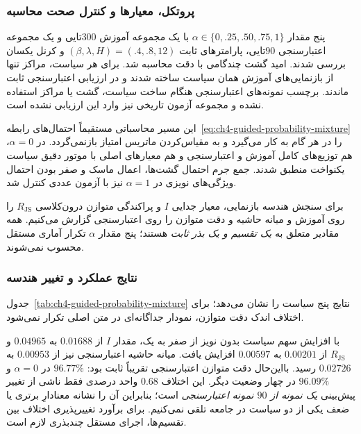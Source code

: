 \subsubsection{پروتکل، معیارها و کنترل صحت محاسبه}
\label{subsec:ch4-guided-probability-protocol}
پنج مقدار $\alpha\in\{0,.25,.50,.75,1\}$
با یک مجموعه آموزش $300$تایی و یک مجموعه
اعتبارسنجی $90$تایی، پارامترهای ثابت
$(\beta,\lambda,H)=(.4,.8,12)$ و کرنل
یکسان بررسی شدند. امید گشت چندگامی با
دقت  محاسبه شد. برای هر سیاست،
مراکز تنها از بازنمایی‌های آموزش همان سیاست
ساخته شدند و در ارزیابی اعتبارسنجی ثابت ماندند.
برچسب نمونه‌های اعتبارسنجی هنگام ساخت سیاست،
گشت یا مراکز استفاده نشده و مجموعه آزمون
تاریخی نیز وارد این ارزیابی نشده است.

این مسیر محاسباتی مستقیماً احتمال‌های
رابطه~\eqref{eq:ch4-guided-probability-mixture}
را در هر گام به کار می‌گیرد و به مقیاس‌کردن
ماتریس امتیاز بازنمی‌گردد.
در $\alpha=0$، هم توزیع‌های کامل آموزش و
اعتبارسنجی و هم معیارهای اصلی با موتور
دقیق سیاست یکنواخت منطبق شدند.
جمع جرم احتمال گشت‌ها، اعمال ماسک و
صفر بودن احتمال ویژگی‌های نویزی در
$\alpha=1$ نیز با آزمون عددی کنترل شد.

برای سنجش هندسه بازنمایی، معیار جدایی
$I$ و پراکندگی متوازن درون‌کلاسی
$R_{\mathrm{JS}}$ را روی آموزش و
میانه حاشیه و دقت متوازن را روی اعتبارسنجی
گزارش می‌کنیم. همه مقادیر متعلق به
\emph{یک تقسیم و یک بذر ثابت} هستند؛
پنج مقدار $\alpha$ تکرار آماری مستقل محسوب
نمی‌شوند.

\subsubsection{نتایج عملکرد و تغییر هندسه}
\label{subsec:ch4-guided-probability-results}
جدول~\ref{tab:ch4-guided-probability-mixture}
نتایج پنج سیاست را نشان می‌دهد؛ برای اختلاف اندک دقت متوازن، نمودار جداگانه‌ای در متن اصلی تکرار نمی‌شود.



با افزایش سهم سیاست بدون نویز از صفر به یک،
مقدار $I$ از $0.01688$ به $0.04965$
و $R_{\mathrm{JS}}$ از $0.00201$
به $0.00597$ افزایش یافت.
میانه حاشیه اعتبارسنجی نیز از $0.00953$
به $0.02726$ رسید. بااین‌حال دقت متوازن
اعتبارسنجی تقریباً ثابت بود:
$96.77\%$ در $\alpha=0$ و
$96.09\%$ در چهار وضعیت دیگر.
این اختلاف $0.68$ واحد درصدی فقط
ناشی از تغییر پیش‌بینی \emph{یک نمونه از
$90$ نمونه اعتبارسنجی} است؛
بنابراین آن را نشانه معنادارِ برتری یا
ضعف یکی از دو سیاست در جامعه تلقی نمی‌کنیم.
برای برآورد تغییرپذیری اختلاف بین تقسیم‌ها،
اجرای مستقل چندبذری لازم است.

